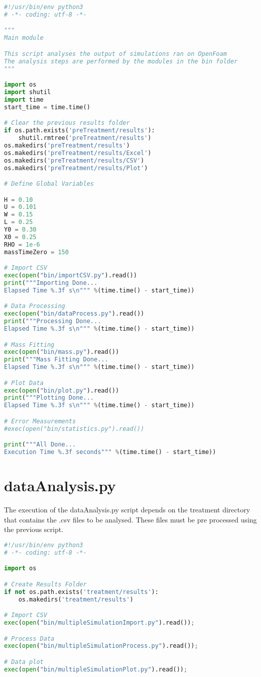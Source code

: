 \documentclass[../main.tex]{subfiles}
\begin{document}
\begin{lstlisting}[language=python]
#!/usr/bin/env python3
# -*- coding: utf-8 -*-

"""
Main module

This script analyses the output of simulations ran on OpenFoam
The analysis steps are performed by the modules in the bin folder
"""

import os
import shutil
import time
start_time = time.time()

# Clear the previous results folder
if os.path.exists('preTreatment/results'):
    shutil.rmtree('preTreatment/results')
os.makedirs('preTreatment/results')
os.makedirs('preTreatment/results/Excel')
os.makedirs('preTreatment/results/CSV')
os.makedirs('preTreatment/results/Plot')

# Define Global Variables

H = 0.10
U = 0.101
W = 0.15
L = 0.25
Y0 = 0.30
X0 = 0.25
RHO = 1e-6
massTimeZero = 150

# Import CSV
exec(open("bin/importCSV.py").read())
print("""Importing Done...
Elapsed Time %.3f s\n""" %(time.time() - start_time))

# Data Processing
exec(open("bin/dataProcess.py").read())
print("""Processing Done...
Elapsed Time %.3f s\n""" %(time.time() - start_time))

# Mass Fitting
exec(open("bin/mass.py").read())
print("""Mass Fitting Done...
Elapsed Time %.3f s\n""" %(time.time() - start_time))

# Plot Data
exec(open("bin/plot.py").read())
print("""Plotting Done...
Elapsed Time %.3f s\n""" %(time.time() - start_time))

# Error Measurements
#exec(open("bin/statistics.py").read())

print("""All Done...
Execution Time %.3f seconds""" %(time.time() - start_time))

\end{lstlisting}
\section{dataAnalysis.py}
\noindent
The execution of the dataAnalysis.py script depends on the treatment directory that contains the .csv files to be analysed. These files must be pre processed using the previous script.
\begin{lstlisting}[language=python]
#!/usr/bin/env python3
# -*- coding: utf-8 -*-

import os

# Create Results Folder
if not os.path.exists('treatment/results'):
    os.makedirs('treatment/results')

# Import CSV
exec(open("bin/multipleSimulationImport.py").read());

# Process Data
exec(open("bin/multipleSimulationProcess.py").read());

# Data plot
exec(open("bin/multipleSimulationPlot.py").read());
\end{lstlisting}
\end{document}
